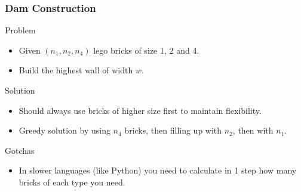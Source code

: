 \documentclass{beamer}
\begin{document}
\begin{frame}
    \frametitle{Dam Construction}
    \begin{block}{Problem}
        \begin{itemize}
            \item Given $(n_1, n_2, n_4)$ lego bricks of size 1, 2 and 4.
            \item Build the highest wall of width $w$.
        \end{itemize}
    \end{block} \pause
    \begin{block}{Solution}
        \begin{itemize}
            \item Should always use bricks of higher size first to maintain flexibility.
            \pause
            \item Greedy solution by using $n_4$ bricks, then filling up with $n_2$, then with $n_1$.
        \end{itemize}
    \end{block} \pause
    \begin{block}{Gotchas}
        \begin{itemize}
            \item In slower languages (like Python) you need to calculate in 1 step how many bricks of each type you need.
        \end{itemize}
    \end{block} 
\end{frame}
\end{document}
